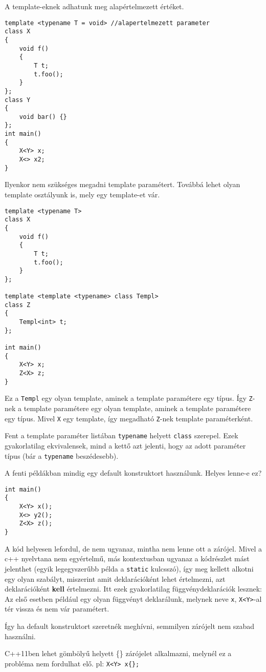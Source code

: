 \documentclass[a4paper,11.5pt]{article}
\begin{document}
	A template-eknek adhatunk meg alapértelmezett értéket.

\begin{lstlisting}
template <typename T = void> //alapertelmezett parameter
class X
{
	void f()
	{
		T t;
		t.foo();
	}
};
class Y
{
	void bar() {}
};
int main()
{
	X<Y> x;
	X<> x2;
}
\end{lstlisting}
	Ilyenkor nem szükséges megadni template paramétert. Továbbá lehet olyan template osztályunk is, mely egy template-et vár.

\begin{lstlisting}
template <typename T>
class X
{
	void f()
	{
		T t;
		t.foo();
	}
};

template <template <typename> class Templ>
class Z
{
	Templ<int> t;
};

int main()
{
	X<Y> x;
	Z<X> z;
}
\end{lstlisting}
	Ez a \texttt{Templ} egy olyan template, aminek a template paramétere egy típus. Így \texttt{Z}-nek a template paramétere egy olyan template, aminek a template paramétere egy típus. Mivel \texttt{X} egy template, így megadható \texttt{Z}-nek template paraméterként.
	\begin{note}
		Fent a template paraméter listában \texttt{typename} helyett \texttt{class} szerepel. Ezek gyakorlatilag ekvivalensek, mind a kettő azt jelenti, hogy az adott paraméter típus (bár a \texttt{typename} beszédesebb).
	\end{note}
	
	A fenti példákban mindig egy default konstruktort használunk. Helyes lenne-e ez?
\begin{lstlisting}
int main()
{
	X<Y> x();
	X<> y2();
	Z<X> z();
}
\end{lstlisting}
	A kód helyesen lefordul, de nem ugyanaz, mintha nem lenne ott a zárójel. Mivel a c++ nyelvtana nem egyértelmű, más kontextusban ugyanaz a kódrészlet mást jelenthet (egyik legegyszerűbb példa a \texttt{static} kulcsszó), így meg kellett alkotni egy olyan szabályt, miszerint amit deklarációként lehet értelmezni, azt deklarációként \textbf{kell} értelmezni. Itt ezek gyakorlatilag függvénydeklarációk lesznek: Az első esetben például egy olyan függvényt deklarálunk, melynek neve \texttt{x}, \texttt{X<Y>}-al tér vissza és nem vár paramétert. 
	
	Így ha default konstruktort szeretnék meghívni, semmilyen zárójelt nem szabad használni.
	\begin{note}
		C++11ben lehet gömbölyű helyett \{\} zárójelet alkalmazni, melynél ez a probléma nem fordulhat elő. pl: \texttt{X<Y> x\{\};}
	\end{note}
	
\end{document}
